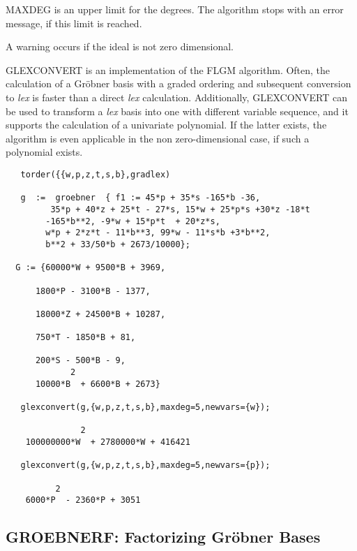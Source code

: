 MAXDEG is an upper limit for the degrees.  The algorithm stops with
an error message, if this limit is reached.

A warning occurs if the ideal is not zero dimensional.

GLEXCONVERT is an implementation of the FLGM algorithm.   Often, the
calculation of a Gr\"obner basis
with a graded ordering and subsequent conversion to {\it lex} is
faster than a direct {\it lex} calculation.   Additionally, GLEXCONVERT
can be used to transform a {\it lex} basis into one with different
variable sequence, and it supports the calculation of a univariate
polynomial.  If the latter exists, the algorithm is even applicable in
the non zero-dimensional case, if such a polynomial exists.

\begin{verbatim}
   torder({{w,p,z,t,s,b},gradlex)

   g  :=  groebner  { f1 := 45*p + 35*s -165*b -36,
         35*p + 40*z + 25*t - 27*s, 15*w + 25*p*s +30*z -18*t
        -165*b**2, -9*w + 15*p*t  + 20*z*s,
        w*p + 2*z*t - 11*b**3, 99*w - 11*s*b +3*b**2,
        b**2 + 33/50*b + 2673/10000};

  G := {60000*W + 9500*B + 3969,

      1800*P - 3100*B - 1377,

      18000*Z + 24500*B + 10287,

      750*T - 1850*B + 81,

      200*S - 500*B - 9,
             2
      10000*B  + 6600*B + 2673}

   glexconvert(g,{w,p,z,t,s,b},maxdeg=5,newvars={w});

               2
    100000000*W  + 2780000*W + 416421

   glexconvert(g,{w,p,z,t,s,b},maxdeg=5,newvars={p});

          2
    6000*P  - 2360*P + 3051

\end{verbatim}

\subsection{GROEBNERF: Factorizing Gr\"obner Bases}

